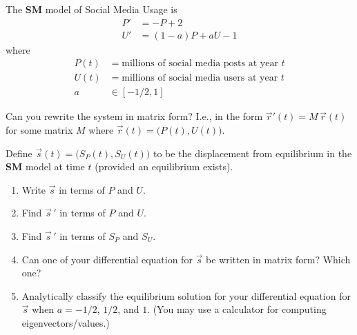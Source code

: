 \documentclass{workbook}
\begin{document}
\begin{slide}
	\question
	The \textbf{SM} model of Social Media Usage is
	\begin{align*}
		P'&=-P+2\\
		U'&=(1-a)P + aU - 1
	\end{align*}
	where
	\begin{align*}
		P(t) &= \text{millions of social media posts at year $t$}\\
		U(t) &= \text{millions of social media users at year $t$}\\
		a &\in [-1/2, 1]
	\end{align*}

	\begin{parts}
		\item Can you rewrite the system in matrix form? I.e., in the form $\vec r'(t) = M\, \vec r(t)$ for some matrix $M$ where $\vec r(t)=\Big(P(t), U(t)\Big)$.
		\item Define $\vec s(t)=\Big(S_P(t),S_U(t)\Big)$  to be the displacement from equilibrium in the \textbf{SM} model at time $t$ (provided an equilibrium exists).
		\begin{enumerate}
			\item Write $\vec s$ in terms of $P$ and $U$.
			\item Find $\vec s\,'$ in terms of $P$ and $U$.
			\item Find $\vec s\,'$ in terms of $S_P$ and $S_U$.
			\item Can one of your differential equation for $\vec s$ be written in matrix form? Which one?
			\item Analytically classify the equilibrium solution for your differential equation for $\vec s$
				when $a=-1/2$, $1/2$, and $1$. (You may use a calculator for computing eigenvectors/values.)
		\end{enumerate}
	\end{parts}
\end{slide}
\end{document}
